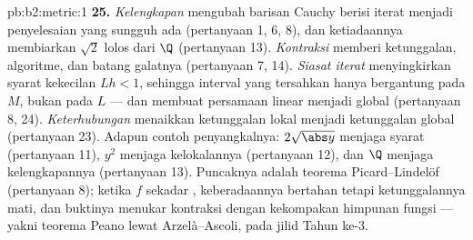 \begin{solution}{pb:b2:metric:1}
\textbf{25.} \emph{Kelengkapan} mengubah barisan Cauchy berisi
iterat menjadi penyelesaian yang sungguh ada (pertanyaan 1, 6, 8), dan
ketiadaannya membiarkan $\sqrt2$ lolos dari $\Q$ (pertanyaan 13).
\emph{Kontraksi} memberi ketunggalan, algoritme, dan
batang galatnya (pertanyaan 7, 14). \emph{Siasat iterat} menyingkirkan
syarat kekecilan $Lh < 1$, sehingga interval yang tersahkan
hanya bergantung pada $M$, bukan pada $L$ --- dan membuat persamaan
linear menjadi global (pertanyaan 8, 24). \emph{Keterhubungan} menaikkan
ketunggalan lokal menjadi ketunggalan global (pertanyaan 23). Adapun
contoh penyangkalnya: $2\sqrt{\abs y}$ menjaga syarat 
(pertanyaan 11), $y^2$ menjaga kelokalannya (pertanyaan 12), dan $\Q$
menjaga kelengkapannya (pertanyaan 13). Puncaknya adalah teorema
Picard--Lindelöf (pertanyaan 8); ketika $f$ sekadar
, keberadaannya bertahan tetapi ketunggalannya mati, dan
buktinya menukar kontraksi dengan kekompakan himpunan fungsi
--- yakni teorema Peano lewat Arzelà--Ascoli, pada jilid Tahun ke-3.

\end{solution}
